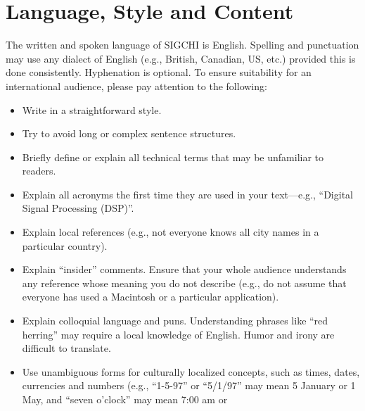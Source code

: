 \section{Language, Style and Content}

The written and spoken language of SIGCHI is English. Spelling and
                                punctuation may use any dialect of English (e.g., British, Canadian,
                                US, etc.) provided this is done consistently. Hyphenation is
                                optional. To ensure suitability for an international audience, please
                                pay attention to the following:

\begin{itemize}
                                \item Write in a straightforward style.
                                \item Try to avoid long or complex sentence structures.
                                \item Briefly define or explain all technical terms that may be
                                  unfamiliar to readers.
                                \item Explain all acronyms the first time they are used in your text---e.g.,
                                ``Digital Signal Processing (DSP)''.
                                \item Explain local references (e.g., not everyone knows all city
                                  names in a particular country).
                                \item Explain ``insider'' comments. Ensure that your whole audience
                                  understands any reference whose meaning you do not describe (e.g.,
                                  do not assume that everyone has used a Macintosh or a particular
                                  application).
                                \item Explain colloquial language and puns. Understanding phrases like
                                  ``red herring'' may require a local knowledge of English.  Humor and
                                  irony are difficult to translate.
                                \item Use unambiguous forms for culturally localized concepts, such as
                                  times, dates, currencies and numbers (e.g., ``1-5-97'' or ``5/1/97''
                                  may mean 5 January or 1 May, and ``seven o'clock'' may mean 7:00 am or

\end{itemize}
